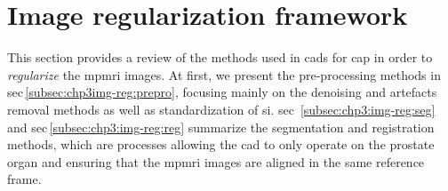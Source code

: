 \section{Image regularization framework}\label{sec:chp3:img-reg}

This section provides a review of the methods used in \acp{cad} for \ac{cap} in order to \emph{regularize} the \ac{mpmri} images.
At first, we present the pre-processing methods in \acs{sec}\,\ref{subsec:chp3img-reg:prepro}, focusing mainly on the denoising and artefacts removal methods as well as standardization of \ac{si}.
\Acl{sec}~\ref{subsec:chp3:img-reg:seg} and \acs{sec}\,\ref{subsec:chp3:img-reg:reg} summarize the segmentation and registration methods, which are processes allowing the \ac{cad} to only operate on the prostate organ and ensuring that the \ac{mpmri} images are aligned in the same reference frame.






